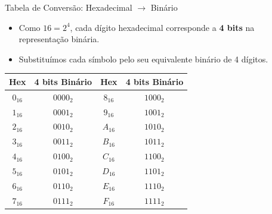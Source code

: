 \begin{frame}{Tabela de Conversão: Hexadecimal $\rightarrow$ Binário}
    \begin{itemize}
        \item Como $16 = 2^4$, cada dígito hexadecimal corresponde a \textbf{4 bits} na representação binária.
        \item Substituímos cada símbolo pelo seu equivalente binário de 4 dígitos.
    \end{itemize}

    \begin{table}[]
        \centering
        \small
        \begin{tabular}{|c|c||c|c|}
            \hline
            \textbf{Hex} & \textbf{4 bits Binário} & \textbf{Hex} & \textbf{4 bits Binário} \\ \hline
            $0_{16}$     & $0000_2$                & $8_{16}$     & $1000_2$                \\ \hline
            $1_{16}$     & $0001_2$                & $9_{16}$     & $1001_2$                \\ \hline
            $2_{16}$     & $0010_2$                & $A_{16}$     & $1010_2$                \\ \hline
            $3_{16}$     & $0011_2$                & $B_{16}$     & $1011_2$                \\ \hline
            $4_{16}$     & $0100_2$                & $C_{16}$     & $1100_2$                \\ \hline
            $5_{16}$     & $0101_2$                & $D_{16}$     & $1101_2$                \\ \hline
            $6_{16}$     & $0110_2$                & $E_{16}$     & $1110_2$                \\ \hline
            $7_{16}$     & $0111_2$                & $F_{16}$     & $1111_2$                \\ \hline
        \end{tabular}
    \end{table}
\end{frame}


